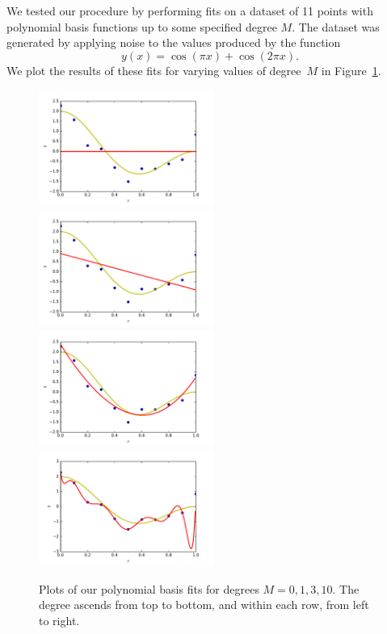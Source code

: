 \documentclass{amsart}
\begin{document}
We tested our procedure by performing fits on a dataset of 11 points with polynomial basis functions up to some specified degree $M$. The dataset was generated by applying noise to the values produced by the function
\begin{equation}
y(x) = \cos(\pi x) + \cos(2\pi x).
\end{equation}
We plot the results of these fits for varying values of degree~$M$ in Figure~\ref{fig:2.1-polybasis}.



\begin{figure}[htbp] %
   \centering
   \includegraphics[width=2.25in]{img/2-1_degree0.pdf}  %
   \includegraphics[width=2.25in]{img/2-1_degree1.pdf}  %
   \includegraphics[width=2.25in]{img/2-1_degree3.pdf}  %
   \includegraphics[width=2.25in]{img/2-1_degree10.pdf}  %
   \caption{Plots of our polynomial basis fits for degrees $M=0,1,3,10$. The degree ascends from top to bottom, and within each row, from left to right.}
   \label{fig:2.1-polybasis}
\end{figure}
\end{document}
